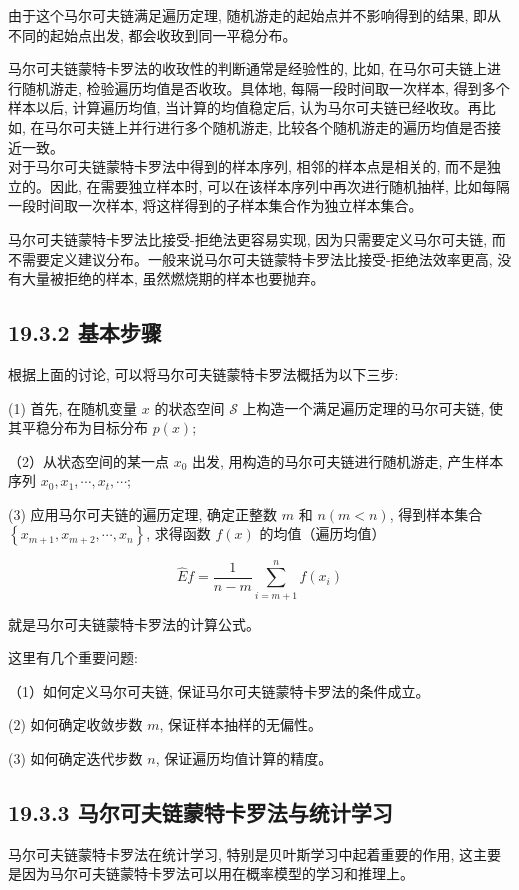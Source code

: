 \documentclass[10pt]{article}
\begin{document}
\begin{CJK*}{UTF8}{bsmi}
由于这个马尔可夫链满足遍历定理, 随机游走的起始点并不影响得到的结果, 即从不同的起始点出发, 都会收玫到同一平稳分布。

马尔可夫链蒙特卡罗法的收玫性的判断通常是经验性的, 比如, 在马尔可夫链上进行随机游走, 检验遍历均值是否收玫。具体地, 每隔一段时间取一次样本, 得到多个样本以后, 计算遍历均值, 当计算的均值稳定后, 认为马尔可夫链已经收玫。再比如, 在马尔可夫链上并行进行多个随机游走, 比较各个随机游走的遍历均值是否接近一致。\\
对于马尔可夫链蒙特卡罗法中得到的样本序列, 相邻的样本点是相关的, 而不是独立的。因此, 在需要独立样本时, 可以在该样本序列中再次进行随机抽样, 比如每隔一段时间取一次样本, 将这样得到的子样本集合作为独立样本集合。

马尔可夫链蒙特卡罗法比接受-拒绝法更容易实现, 因为只需要定义马尔可夫链, 而不需要定义建议分布。一般来说马尔可夫链蒙特卡罗法比接受-拒绝法效率更高, 没有大量被拒绝的样本, 虽然燃烧期的样本也要抛弃。

\subsection*{19.3.2 基本步骤}
根据上面的讨论, 可以将马尔可夫链蒙特卡罗法概括为以下三步:

(1) 首先, 在随机变量 $x$ 的状态空间 $\mathcal{S}$ 上构造一个满足遍历定理的马尔可夫链, 使其平稳分布为目标分布 $p(x)$;

（2）从状态空间的某一点 $x_{0}$ 出发, 用构造的马尔可夫链进行随机游走, 产生样本序列 $x_{0}, x_{1}, \cdots, x_{t}, \cdots ;$

(3) 应用马尔可夫链的遍历定理, 确定正整数 $m$ 和 $n(m<n)$, 得到样本集合 $\left\{x_{m+1}, x_{m+2}, \cdots, x_{n}\right\}$, 求得函数 $f(x)$ 的均值（遍历均值）


\begin{equation*}
\hat{E} f=\frac{1}{n-m} \sum_{i=m+1}^{n} f\left(x_{i}\right) \tag{19.33}
\end{equation*}


就是马尔可夫链蒙特卡罗法的计算公式。

这里有几个重要问题:

（1）如何定义马尔可夫链, 保证马尔可夫链蒙特卡罗法的条件成立。

(2) 如何确定收敛步数 $m$, 保证样本抽样的无偏性。

(3) 如何确定迭代步数 $n$, 保证遍历均值计算的精度。

\subsection*{19.3.3 马尔可夫链蒙特卡罗法与统计学习}
马尔可夫链蒙特卡罗法在统计学习, 特别是贝叶斯学习中起着重要的作用, 这主要是因为马尔可夫链蒙特卡罗法可以用在概率模型的学习和推理上。


\end{CJK*}
\end{document}
